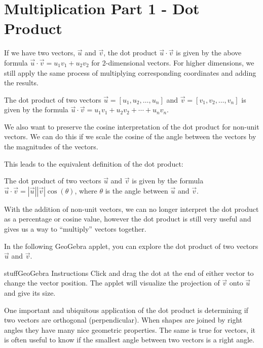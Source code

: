 \documentclass{ximera}
\begin{document}
\section*{Multiplication Part 1 - Dot Product}

If we have two vectors, $\vec u$ and $\vec v$, the dot product $\vec u\cdot\vec v$ is given by the above formula $\vec u\cdot\vec v=u_1v_1+u_2v_2$ for 2-dimensional vectors. For higher dimensions, we still apply the same process of multiplying corresponding coordinates and adding the results.

\begin{definition}
The dot product of two vectors $\vec{u}=[u_1,u_2,\ldots,u_n]$ and $\vec{v}=[v_1,v_2,\ldots,v_n]$ is given by the formula $\vec{u}\cdot\vec{v}=u_1v_1+u_2v_2+\cdots+u_nv_n$.
\end{definition}

We also want to preserve the cosine interpretation of the dot product for non-unit vectors. We can do this if we scale the cosine of the angle between the vectors by the magnitudes of the vectors. 

This leads to the equivalent definition of the dot product:

\begin{definition}
The dot product of two vectors $\vec{u}$ and $\vec{v}$ is given by the formula $\vec{u}\cdot\vec{v}=|\vec{u}||\vec{v}|\cos(\theta)$, where $\theta$ is the angle between $\vec{u}$ and $\vec{v}$.
\end{definition}

With the addition of non-unit vectors, we can no longer interpret the dot product as a percentage or cosine value, however the dot product is still very useful and gives us a way to ``multiply'' vectors together.

In the following GeoGebra applet, you can explore the dot product of two vectors $\vec u$ and $\vec v$.

\begin{expandable}{stuff}{GeoGebra Instructions}
    Click and drag the dot at the end of either vector to change the vector position. The applet will visualize the projection of $\vec{v}$ onto $\vec{u}$ and give its size.
\end{expandable}

\begin{center}
\end{center}

One important and ubiquitous application of the dot product is determining if two vectors are orthogonal (perpendicular). When shapes are joined by right angles they have many nice geometric properties. The same is true for vectors, it is often useful to know if the smallest angle between two vectors is a right angle.
\end{document}
